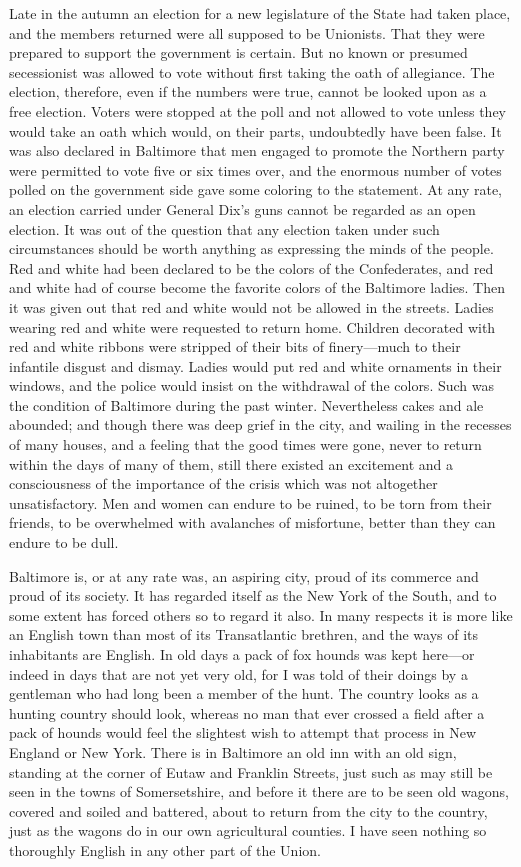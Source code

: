 Late in the autumn an election for a new legislature of the State
had taken place, and the members returned were all supposed to be
Unionists.  That they were prepared to support the government is
certain.  But no known or presumed secessionist was allowed to vote
without first taking the oath of allegiance.  The election,
therefore, even if the numbers were true, cannot be looked upon as
a free election.  Voters were stopped at the poll and not allowed
to vote unless they would take an oath which would, on their parts,
undoubtedly have been false.  It was also declared in Baltimore
that men engaged to promote the Northern party were permitted to
vote five or six times over, and the enormous number of votes
polled on the government side gave some coloring to the statement.
At any rate, an election carried under General Dix's guns cannot be
regarded as an open election.  It was out of the question that any
election taken under such circumstances should be worth anything as
expressing the minds of the people.  Red and white had been
declared to be the colors of the Confederates, and red and white
had of course become the favorite colors of the Baltimore ladies.
Then it was given out that red and white would not be allowed in
the streets.  Ladies wearing red and white were requested to return
home.  Children decorated with red and white ribbons were stripped
of their bits of finery---much to their infantile disgust and
dismay.  Ladies would put red and white ornaments in their windows,
and the police would insist on the withdrawal of the colors.  Such
was the condition of Baltimore during the past winter.
Nevertheless cakes and ale abounded; and though there was deep
grief in the city, and wailing in the recesses of many houses, and
a feeling that the good times were gone, never to return within the
days of many of them, still there existed an excitement and a
consciousness of the importance of the crisis which was not
altogether unsatisfactory.  Men and women can endure to be ruined,
to be torn from their friends, to be overwhelmed with avalanches of
misfortune, better than they can endure to be dull.

Baltimore is, or at any rate was, an aspiring city, proud of its
commerce and proud of its society.  It has regarded itself as the
New York of the South, and to some extent has forced others so to
regard it also.  In many respects it is more like an English town
than most of its Transatlantic brethren, and the ways of its
inhabitants are English.  In old days a pack of fox hounds was kept
here---or indeed in days that are not yet very old, for I was told
of their doings by a gentleman who had long been a member of the
hunt.  The country looks as a hunting country should look, whereas
no man that ever crossed a field after a pack of hounds would feel
the slightest wish to attempt that process in New England or New
York.  There is in Baltimore an old inn with an old sign, standing
at the corner of Eutaw and Franklin Streets, just such as may still
be seen in the towns of Somersetshire, and before it there are to
be seen old wagons, covered and soiled and battered, about to
return from the city to the country, just as the wagons do in our
own agricultural counties.  I have seen nothing so thoroughly
English in any other part of the Union.

